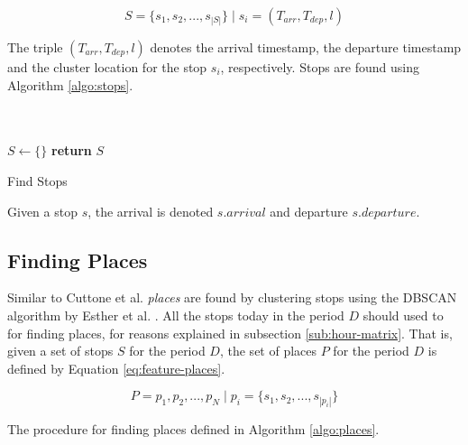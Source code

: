 \begin{equation}
\label{eq:feature-stops}
S = \{s_1, s_2, ..., s_{|S|}\} \;| \; s_i = (T_{arr}, T_{dep}, l)
\end{equation}

The triple $(T_{arr}, T_{dep}, l)$ denotes the arrival timestamp, the departure timestamp and the cluster location for the stop $s_i$, respectively. Stops are found using Algorithm \ref{algo:stops}.

\begin{algorithm}[H]
\SetAlgoLined
{}\\
\\

 $S \leftarrow \{ \}$\;
 \textbf{return} $S$\;
 \label{algo:stops}
 \caption{Find Stops}
\end{algorithm}

Given a stop $s$, the arrival is denoted $s.arrival$ and departure $s.departure$.

\subsection{Finding Places}
Similar to Cuttone et al. \textit{places} are found by clustering stops using the DBSCAN algorithm by Esther et al. \cite{density-based-1996}. All the stops today in the period $D$ should used to for finding places, for reasons explained in subsection \ref{sub:hour-matrix}. That is, given a set of stops $S$ for the period $D$, the set of places $P$ for the period $D$ is defined by Equation \eqref{eq:feature-places}.

\begin{equation}
\label{eq:feature-places}
P = {p_1, p_2, ..., p_N} \;|\; p_i = \{s_1, s_2, ..., s_{|p_i|}\}
\end{equation}

The procedure for finding places defined in Algorithm \ref{algo:places}.

